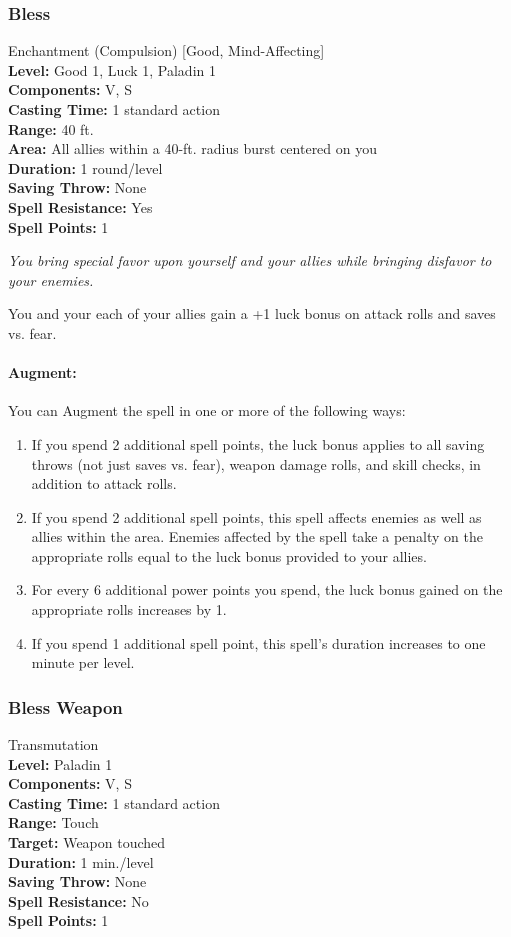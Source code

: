 \subsubsection{Bless}
\label{Spell:Bless}
Enchantment (Compulsion) [Good, Mind-Affecting]
\\ \textbf{Level:} Good 1, Luck 1, Paladin 1
\\ \textbf{Components:} V, S
\\ \textbf{Casting Time:} 1 standard action
\\ \textbf{Range:} 40 ft.
\\ \textbf{Area:} All allies within a 40-ft. radius burst centered on you
\\ \textbf{Duration:} 1 round/level
\\ \textbf{Saving Throw:} None
\\ \textbf{Spell Resistance:} Yes
\\ \textbf{Spell Points:} 1

\emph{You bring special favor upon yourself and your allies while bringing disfavor to your enemies.}

You and your each of your allies gain a +1 luck bonus on attack rolls and saves vs. fear.

\paragraph{Augment:} You can Augment the spell in one or more of the following ways:
\begin{enumerate}
 \item If you spend 2 additional spell points, the luck bonus applies to all saving throws (not just saves vs. fear),
 weapon damage rolls, and skill checks, in addition to attack rolls.
 \item If you spend 2 additional spell points, this spell affects enemies as well as allies within the area.
 Enemies affected by the spell take a penalty on the appropriate rolls equal to the luck bonus provided to your allies.
 \item For every 6 additional power points you spend, the luck bonus gained on the appropriate rolls increases by 1.
 \item If you spend 1 additional spell point, this spell's duration increases to one minute per level.
\end{enumerate}
\subsubsection{Bless Weapon}
\label{Spell:BlessWeapon}
Transmutation
\\ \textbf{Level:} Paladin 1
\\ \textbf{Components:} V, S
\\ \textbf{Casting Time:} 1 standard action
\\ \textbf{Range:} Touch
\\ \textbf{Target:} Weapon touched
\\ \textbf{Duration:} 1 min./level
\\ \textbf{Saving Throw:} None
\\ \textbf{Spell Resistance:} No
\\ \textbf{Spell Points:} 1

